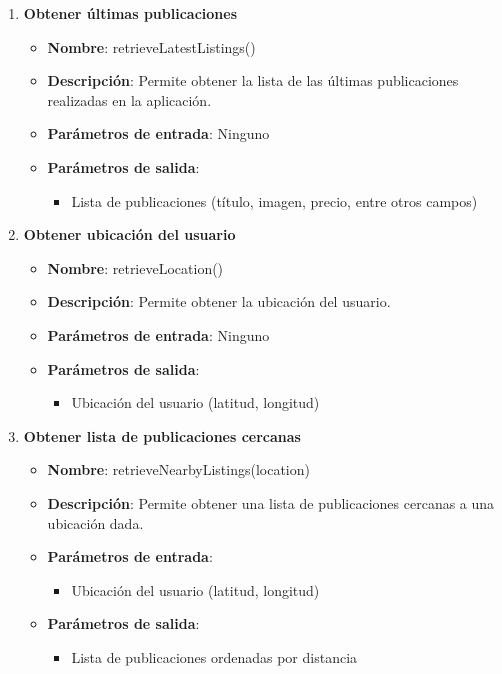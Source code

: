 \begin{enumerate}[label=SOP-\protect\twodigits{\arabic*}:, align=left, leftmargin=*]
\item \textbf{Obtener últimas publicaciones}
\begin{itemize}
\item \textbf{Nombre}: retrieveLatestListings()
\item \textbf{Descripción}: Permite obtener la lista de las últimas publicaciones realizadas en la aplicación.
\item \textbf{Parámetros de entrada}: Ninguno
\item \textbf{Parámetros de salida}:
\begin{itemize}
\item Lista de publicaciones (título, imagen, precio, entre otros campos)
\end{itemize}
\end{itemize}

\item \textbf{Obtener ubicación del usuario}
\begin{itemize}
\item \textbf{Nombre}: retrieveLocation()
\item \textbf{Descripción}: Permite obtener la ubicación del usuario.
\item \textbf{Parámetros de entrada}: Ninguno
\item \textbf{Parámetros de salida}:
\begin{itemize}
\item Ubicación del usuario (latitud, longitud)
\end{itemize}
\end{itemize}

\item \textbf{Obtener lista de publicaciones cercanas}
\begin{itemize}
\item \textbf{Nombre}: retrieveNearbyListings(location)
\item \textbf{Descripción}: Permite obtener una lista de publicaciones cercanas a una ubicación dada.
\item \textbf{Parámetros de entrada}:
\begin{itemize}
\item Ubicación del usuario (latitud, longitud)
\end{itemize}
\item \textbf{Parámetros de salida}:
\begin{itemize}
\item Lista de publicaciones ordenadas por distancia
\end{itemize}
\end{itemize}


\end{enumerate}
